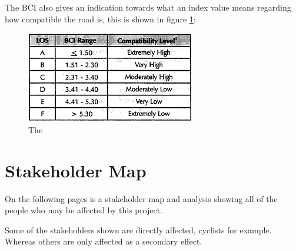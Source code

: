 \documentclass[a4paper]{report}
\begin{document}
The BCI also gives an indication towards what an index value means regarding how compatible the road is, this is shown in figure \ref{fig:bci_los}:

\begin{figure}
\centering
\includegraphics[scale=0.7]{figures/research_report/bci_los}
\caption{The}
\label{fig:bci_los}
\end{figure}

\chapter{Stakeholder Map}
\label{ch:stakeholders}
On the following pages is a stakeholder map and analysis showing all of the people who may be affected by this project. 

Some of the stakeholders shown are directly affected, cyclists for example. Whereas others are only affected as a secondary effect.
\end{document}
